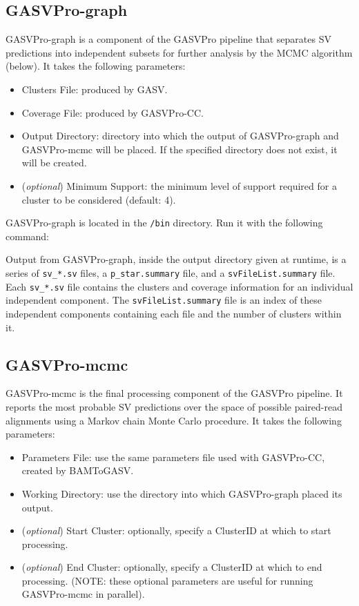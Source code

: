 \documentclass[11pt]{article}
\begin{document}
\subsection{GASVPro-graph}
\label{sec:gasvpro-graph}
GASVPro-graph is a component of the GASVPro pipeline that separates SV predictions into independent subsets for further analysis by the MCMC algorithm (below). It takes the following parameters:
\begin{itemize}
	\item Clusters File: produced by GASV. 
	\item Coverage File: produced by GASVPro-CC. 
	\item Output Directory: directory into which the output of GASVPro-graph and GASVPro-mcmc will be placed. If the specified directory does not exist, it will be created. 
	\item (\textit{optional}) Minimum Support: the minimum level of support required for a cluster to be considered (default: 4).
\end{itemize}

\noindent GASVPro-graph is located in the \verb+/bin+ directory. Run it with the following command:
\begin{framed}
\end{framed}

Output from GASVPro-graph, inside the output directory given at runtime, is a series of \verb+sv_*.sv+ files, a \verb+p_star.summary+ file, and a \verb+svFileList.summary+ file. Each \verb+sv_*.sv+ file contains the clusters and coverage information for an individual independent component. The \verb+svFileList.summary+ file is an index of these independent components containing each file and the number of clusters within it.

\subsection{GASVPro-mcmc}
\label{sec:gasvpro-mcmc}
GASVPro-mcmc is the final processing component of the GASVPro pipeline. It reports the most probable SV predictions over the space of possible paired-read alignments using a Markov chain Monte Carlo procedure. It takes the following parameters:
\begin{itemize}
	\item Parameters File: use the same parameters file used with GASVPro-CC, created by BAMToGASV.
	\item Working Directory: use the directory into which GASVPro-graph placed its output.
	\item ({\em optional}) Start Cluster: optionally, specify a ClusterID at which to start processing.
	\item ({\em optional}) End Cluster: optionally, specify a ClusterID at which to end processing. ({\small NOTE: these optional parameters are useful for running GASVPro-mcmc in parallel}).
\end{itemize}
\end{document}

